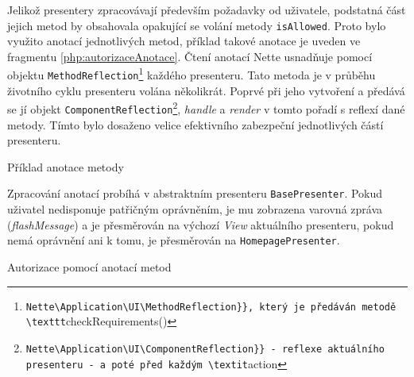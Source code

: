 Jelikož presentery zpracovávají především požadavky od uživatele, podstatná část jejich metod by obsahovala opakující se volání metody \texttt{isAllowed}. Proto bylo využito anotací jednotlivých metod, příklad takové anotace je uveden ve fragmentu \ref{php:autorizaceAnotace}. Čtení anotací Nette usnadňuje pomocí objektu \texttt{MethodReflection}\footnote{\Verb{Nette\Application\UI\MethodReflection}}, který je předáván metodě \texttt{checkRequirements()} každého presenteru. Tato metoda je v průběhu životního cyklu presenteru volána několikrát. Poprvé při jeho vytvoření a předává se jí objekt \texttt{ComponentReflection}\footnote{\Verb{Nette\Application\UI\ComponentReflection}} - reflexe aktuálního presenteru - a poté před každým \textit{action}, \textit{handle} a \textit{render} v tomto pořadí s reflexí dané metody. Tímto bylo dosaženo velice efektivního zabezpeční jednotlivých částí presenteru.

\begin{listing}[ht]
\caption{Příklad anotace metody}
\label{php:autorizaceAnotace}
\end{listing}

\clearpage
Zpracování anotací probíhá v abstraktním presenteru \texttt{BasePresenter}. Pokud uživatel nedisponuje patřičným oprávněním, je mu zobrazena varovná zpráva (\textit{flashMessage}) a je přesměrován na výchozí \textit{View} aktuálního presenteru, pokud nemá oprávnění ani k tomu, je přesměrován na \texttt{HomepagePresenter}.

\begin{listing}[ht]
\caption{Autorizace pomocí anotací metod}
\label{php:autorizaceCheckRequirements}
\end{listing}